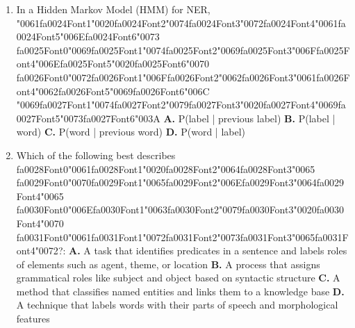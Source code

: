 \documentclass[11pt]{article}
\begin{document}
\begin{enumerate}[leftmargin=*]
  \item In a Hidden Markov Model (HMM) for NER, {\char"0061}{\csname fa0024Font1\endcsname\char"0020}{\csname fa0024Font2\endcsname\char"0074}{\csname fa0024Font3\endcsname\char"0072}{\csname fa0024Font4\endcsname\char"0061}{\csname fa0024Font5\endcsname\char"006E}{\csname fa0024Font6\endcsname\char"0073} {\csname fa0025Font0\endcsname\char"0069}{\csname fa0025Font1\endcsname\char"0074}{\csname fa0025Font2\endcsname\char"0069}{\csname fa0025Font3\endcsname\char"006F}{\csname fa0025Font4\endcsname\char"006E}{\csname fa0025Font5\endcsname\char"0020}{\csname fa0025Font6\endcsname\char"0070} {\csname fa0026Font0\endcsname\char"0072}{\csname fa0026Font1\endcsname\char"006F}{\csname fa0026Font2\endcsname\char"0062}{\csname fa0026Font3\endcsname\char"0061}{\csname fa0026Font4\endcsname\char"0062}{\csname fa0026Font5\endcsname\char"0069}{\csname fa0026Font6\endcsname\char"006C} {\char"0069}{\csname fa0027Font1\endcsname\char"0074}{\csname fa0027Font2\endcsname\char"0079}{\csname fa0027Font3\endcsname\char"0020}{\csname fa0027Font4\endcsname\char"0069}{\csname fa0027Font5\endcsname\char"0073}{\csname fa0027Font6\endcsname\char"003A}
    \textbf{A.} P(label | previous label)
    \textbf{B.} P(label | word)
    \textbf{C.} P(word | previous word)
    \textbf{D.} P(word | label)

  \item Which of the following best describes {\csname fa0028Font0\endcsname\char"0061}{\csname fa0028Font1\endcsname\char"0020}{\csname fa0028Font2\endcsname\char"0064}{\csname fa0028Font3\endcsname\char"0065} {\csname fa0029Font0\endcsname\char"0070}{\csname fa0029Font1\endcsname\char"0065}{\csname fa0029Font2\endcsname\char"006E}{\csname fa0029Font3\endcsname\char"0064}{\csname fa0029Font4\endcsname\char"0065} {\csname fa0030Font0\endcsname\char"006E}{\csname fa0030Font1\endcsname\char"0063}{\csname fa0030Font2\endcsname\char"0079}{\csname fa0030Font3\endcsname\char"0020}{\csname fa0030Font4\endcsname\char"0070} {\csname fa0031Font0\endcsname\char"0061}{\csname fa0031Font1\endcsname\char"0072}{\csname fa0031Font2\endcsname\char"0073}{\csname fa0031Font3\endcsname\char"0065}{\csname fa0031Font4\endcsname\char"0072}?:
    \textbf{A.} A task that identifies predicates in a sentence and labels roles of elements such as agent, theme, or location
    \textbf{B.} A process that assigns grammatical roles like subject and object based on syntactic structure
    \textbf{C.} A method that classifies named entities and links them to a knowledge base
    \textbf{D.} A technique that labels words with their parts of speech and morphological features


\end{enumerate}
\end{document}
